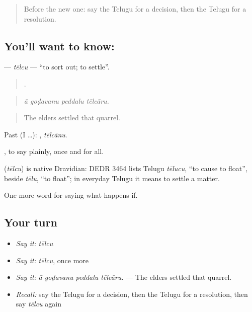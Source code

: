 \label{lesson:TE-C425-telcu}



\begin{quote}
Before the new one: say the Telugu for a decision, then the Telugu for a resolution.
\end{quote}

\subsection*{You'll want to know: }
\textbf{} — \emph{tēlcu} — \textquotedblleft{}to sort out; to settle\textquotedblright{}.

\begin{quote}
   .
\end{quote}

\begin{quote}
\emph{ā goḍavanu peddalu tēlcāru.}
\end{quote}

\begin{quote}
The elders settled that quarrel.
\end{quote}

Past (I …): , \emph{tēlcānu}.

 , to say plainly, once and for all.

\begin{cousinweb}
\textbf{} (\emph{tēlcu}) is native Dravidian: DEDR 3464 lists Telugu \emph{tēlucu}, \textquotedblleft{}to cause to float\textquotedblright{}, beside \emph{tēlu}, \textquotedblleft{}to float\textquotedblright{}; in everyday Telugu it means to settle a matter.
\end{cousinweb}

\begin{grammarlens}[title={What you've built}]
One more word for saying what happens if.
\end{grammarlens}

\subsection*{Your turn}
\begin{itemize}
\raggedright
  \item \emph{Say it:} \emph{tēlcu}
  \item \emph{Say it:} \emph{tēlcu}, once more
  \item \emph{Say it:} \emph{ā goḍavanu peddalu tēlcāru.} — The elders settled that quarrel.
  \item \emph{Recall:} say the Telugu for a decision, then the Telugu for a resolution, then say \emph{tēlcu} again
\end{itemize}

